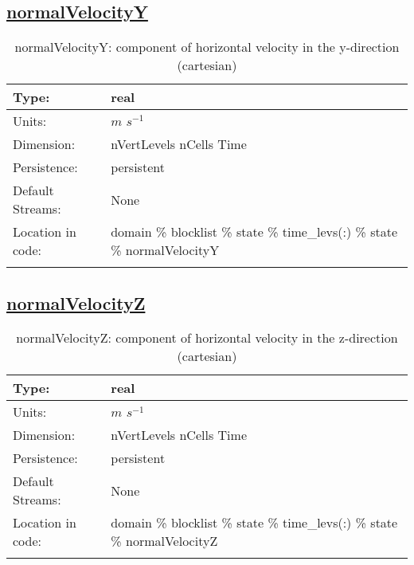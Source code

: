 \subsection[normalVelocityY]{\hyperref[sec:var_tab_state]{normalVelocityY}}
\label{subsec:var_sec_state_normalVelocityY}
\begin{center}
\begin{longtable}{| p{2.0in} | p{4.0in} |}
        \hline 
        Type: & real \\
        \hline 
        Units: & $m$ $s^{-1}$ \\
        \hline 
        Dimension: & nVertLevels nCells Time \\
        \hline 
        Persistence: & persistent \\
        \hline 
		 Default Streams: & None \\
        \hline 
		 Location in code: & domain \% blocklist \% state \% time\_levs(:) \% state \% normalVelocityY \\
		 \hline 
    \caption{normalVelocityY: component of horizontal velocity in the y-direction (cartesian)}
\end{longtable}
\end{center}
\subsection[normalVelocityZ]{\hyperref[sec:var_tab_state]{normalVelocityZ}}
\label{subsec:var_sec_state_normalVelocityZ}
\begin{center}
\begin{longtable}{| p{2.0in} | p{4.0in} |}
        \hline 
        Type: & real \\
        \hline 
        Units: & $m$ $s^{-1}$ \\
        \hline 
        Dimension: & nVertLevels nCells Time \\
        \hline 
        Persistence: & persistent \\
        \hline 
		 Default Streams: & None \\
        \hline 
		 Location in code: & domain \% blocklist \% state \% time\_levs(:) \% state \% normalVelocityZ \\
		 \hline 
    \caption{normalVelocityZ: component of horizontal velocity in the z-direction (cartesian)}
\end{longtable}
\end{center}
